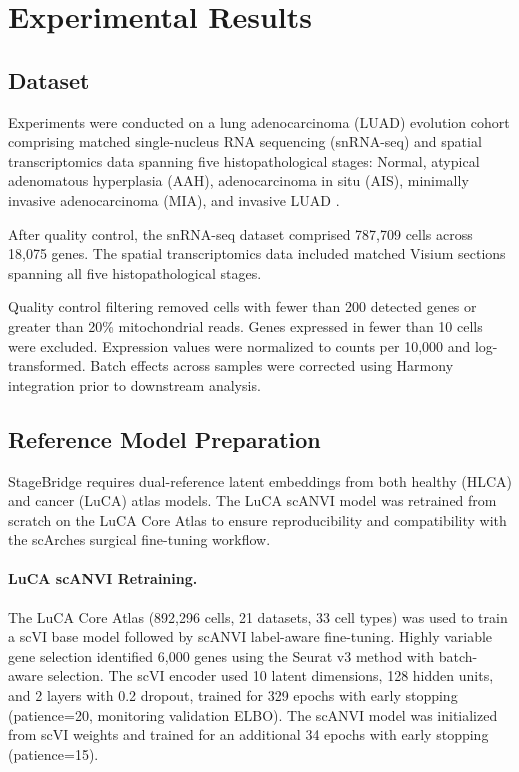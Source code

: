\section{Experimental Results}

\subsection{Dataset}

Experiments were conducted on a lung adenocarcinoma (LUAD) evolution cohort comprising matched single-nucleus RNA sequencing (snRNA-seq) and spatial transcriptomics data spanning five histopathological stages: Normal, atypical adenomatous hyperplasia (AAH), adenocarcinoma in situ (AIS), minimally invasive adenocarcinoma (MIA), and invasive LUAD \cite{Peng2025-xu}.

After quality control, the snRNA-seq dataset comprised 787,709 cells across 18,075 genes. The spatial transcriptomics data included matched Visium sections spanning all five histopathological stages.

Quality control filtering removed cells with fewer than 200 detected genes or greater than 20\% mitochondrial reads. Genes expressed in fewer than 10 cells were excluded. Expression values were normalized to counts per 10,000 and log-transformed. Batch effects across samples were corrected using Harmony integration prior to downstream analysis.


\subsection{Reference Model Preparation}

StageBridge requires dual-reference latent embeddings from both healthy (HLCA) and cancer (LuCA) atlas models. The LuCA scANVI model was retrained from scratch on the LuCA Core Atlas to ensure reproducibility and compatibility with the scArches surgical fine-tuning workflow.

\paragraph{LuCA scANVI Retraining.} The LuCA Core Atlas \cite{Salcher2022-luca} (892,296 cells, 21 datasets, 33 cell types) was used to train a scVI base model followed by scANVI label-aware fine-tuning. Highly variable gene selection identified 6,000 genes using the Seurat v3 method with batch-aware selection. The scVI encoder used 10 latent dimensions, 128 hidden units, and 2 layers with 0.2 dropout, trained for 329 epochs with early stopping (patience=20, monitoring validation ELBO). The scANVI model was initialized from scVI weights and trained for an additional 34 epochs with early stopping (patience=15).


